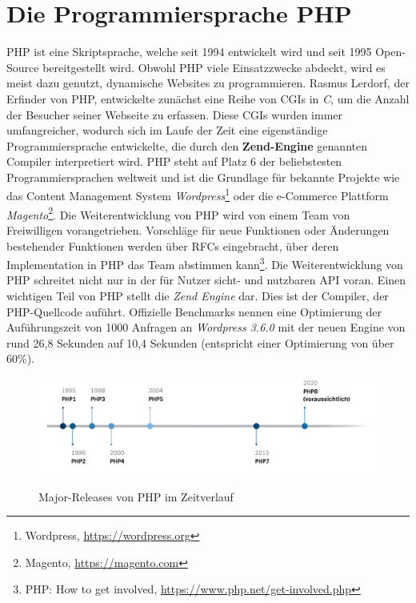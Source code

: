 \section{Die Programmiersprache PHP}\label{zend}
\ac{PHP} ist eine Skriptsprache, welche seit 1994 entwickelt wird und seit 1995 Open-Source bereitgestellt wird.
Obwohl \ac{PHP} viele Einsatzzwecke abdeckt, wird es meist dazu genutzt, dynamische Websites zu programmieren.
Rasmus Lerdorf, der Erfinder von \ac{PHP}, entwickelte zunächst eine Reihe von \acp{CGI} in \textit{C}, um die Anzahl der 
Besucher seiner Webseite zu erfassen. Diese \acp{CGI} wurden immer umfangreicher, wodurch sich im Laufe der Zeit eine 
eigenständige Programmiersprache entwickelte, die durch den \textbf{Zend-Engine} genannten Compiler interpretiert wird.
\ac{PHP} steht auf Platz 6 der beliebstesten Programmiersprachen weltweit\cite{carbonnelle_pypl_2019} und ist die Grundlage
für bekannte Projekte wie das Content Management System \textit{Wordpress}\footnote{Wordpress, \url{https://wordpress.org}}
oder die e-Commerce Plattform \textit{Magento}\footnote{Magento, \url{https://magento.com}}. Die Weiterentwicklung 
von \ac{PHP} wird von einem Team von Freiwilligen vorangetrieben. Vorschläge für neue Funktionen oder Änderungen bestehender 
Funktionen werden über \acp{RFC} eingebracht, über deren Implementation in \ac{PHP} das Team abstimmen kann\footnote{PHP: How to get involved, \url{https://www.php.net/get-involved.php}}. 
Die Weiterentwicklung von \acs{PHP} schreitet nicht nur in der für Nutzer sicht- und nutzbaren \ac{API} voran. Einen wichtigen Teil 
von \acs{PHP} stellt die \textit{Zend Engine} dar. Dies ist der Compiler, der \acs{PHP}-Quellcode auführt. Offizielle 
Benchmarks nennen eine Optimierung der Auführungszeit von 1000 Anfragen an \textit{Wordpress 3.6.0} mit der neuen Engine von
rund 26,8 Sekunden auf 10,4 Sekunden (entspricht einer Optimierung von über 60\%).\cite{php_group_php:_nodate-6} 

\begin{figure}[bth]
    \myfloatalign
    {\includegraphics[width=1\linewidth]{gfx/timeline}} \quad
    \caption[Major-Releases von PHP im Zeitverlauf]{Major-Releases von \ac{PHP} im Zeitverlauf}\label{fig:timeline}
\end{figure}

